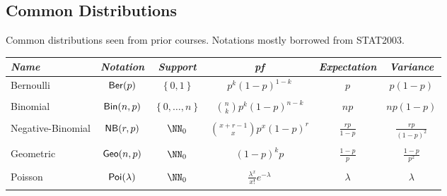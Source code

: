 \subsection*{Common Distributions}

Common distributions seen from prior courses. Notations mostly borrowed from STAT2003.

\begin{longtable}{lccccc}                                                                                                                                                                                                                                         \\\bottomrule
    \hline
    \emph{Name}       & \emph{Notation}          & \emph{Support}                 & \emph{pf}                                                                                                & \emph{Expectation}       & \emph{Variance}            \\\midrule
    Bernoulli         & ${\sf Ber} (p)$               & $\left\{ 0,1 \right\}$         & $p^k (1-p)^{1-k}$                                                                                        & $p$                      & $p(1-p)$                   \\\\
    Binomial          & ${\sf Bin} (n,p)$             & $\left\{ 0,\ldots ,n \right\}$ & $\binom{n}{k} p^{k} (1-p)^{n-k}$                                                                         & $np$                     & $np(1-p)$                  \\\\
    Negative-Binomial & ${\sf NB} (r,p)$            & $\NN_0$                        & $\binom{x+r-1}{x} p^{x} (1-p)^{r}$                                                                       & $\frac{rp}{1-p}$         & $\frac{rp}{(1-p)^2}$       \\\\
    Geometric         & ${\sf Geo} (n,p)$             & $\NN_{0}$                      & $(1-p)^k p$                                                                                              & $\frac{1-p}{p}$          & $\frac{1-p}{p^2}$          \\\\
    Poisson           & ${\sf Poi} (\lambda)$         & $\NN_{0}$                      & $\frac{\lambda^x}{x!}e^{-\lambda}$                                                                       & $\lambda$                & $\lambda$                  \\\\

\end{longtable}
